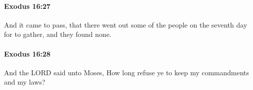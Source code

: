 		\paragraph{Exodus 16:27} %
			\label{EXODUS-16-27}

			And it came to pass, that there went out some of the people on the seventh day for to gather, and they found none.


		\paragraph{Exodus 16:28} %
			\label{EXODUS-16-28}

			And the LORD said unto Moses, How long refuse ye to keep my commandments and my laws?



